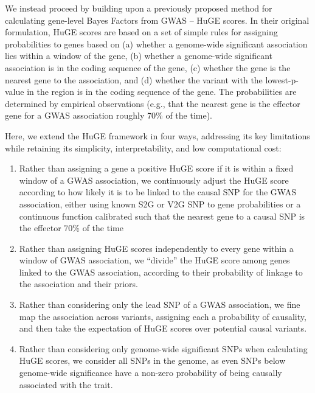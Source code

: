 \documentclass[11pt]{article}
\begin{document}
We instead proceed by building upon a previously proposed method
for calculating gene-level Bayes Factors from GWAS -- HuGE scores\cite{}. In
their original formulation, HuGE scores are based on a set of simple
rules for assigning probabilities to genes based on (a) whether a
genome-wide significant association lies within a window of the gene,
(b) whether a genome-wide significant association is in the coding
sequence of the gene, (c) whether the gene is the nearest gene to the
association, and (d) whether the variant with the lowest-p-value in
the region is in the coding sequence of the gene. The probabilities
are determined by empirical observations (e.g., that the nearest gene
is the effector gene for a GWAS association roughly 70\% of the time\cite{}).

Here, we extend the HuGE framework in four ways, addressing its key
limitations while retaining its simplicity, interpretability, and low
computational cost:
\begin{enumerate}
\item Rather than assigning a gene a positive HuGE score if it is within
a fixed window of a GWAS association, we continuously adjust the HuGE
score according to how likely it is to be linked to the causal SNP for
the GWAS association, either using known S2G\cite{} or V2G\cite{} SNP
to gene probabilities or a continuous function calibrated such that
the nearest gene to a causal SNP is the effector 70\% of the time\cite{}
\item Rather than assigning HuGE scores independently to every gene within a window of GWAS
  association, we ``divide'' the HuGE score among genes linked to the
  GWAS association, according to their probability of linkage to the
  association and their priors.
\item Rather than considering only the lead SNP of a GWAS association,
  we fine map the association across variants, assigning each a
  probability of causality, and then take the expectation of HuGE
  scores over potential causal variants.
\item Rather than considering only genome-wide significant SNPs when
  calculating HuGE scores, we consider all SNPs in the genome, as even
  SNPs below genome-wide significance have a non-zero probability of
  being causally associated with the trait.
\end{enumerate}
\end{document}

